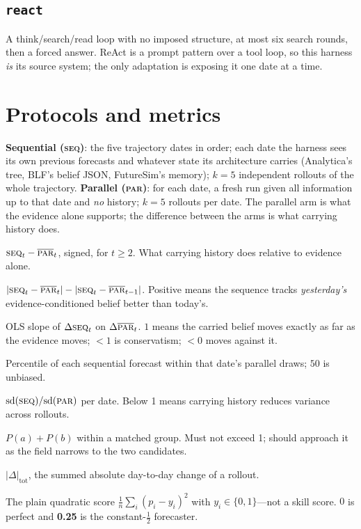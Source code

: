 \documentclass[10pt]{article}
\newcommand{\seq}{\textsc{seq}}
\newcommand{\pl}{\textsc{par}}
\newcommand{\hr}[1]{\texttt{#1}}
\begin{document}
\subsection{\hr{react}}
A think/search/read loop with no imposed structure, at most six search rounds, then a forced
answer. ReAct is a prompt pattern over a tool loop, so this harness \emph{is} its source system;
the only adaptation is exposing it one date at a time.

\FloatBarrier
\section{Protocols and metrics}\label{sec:protocol}
\textbf{Sequential (\seq)}: the five trajectory dates in order; each date the harness sees its own
previous forecasts and whatever state its architecture carries (Analytica's tree, BLF's belief JSON,
FutureSim's memory); $k{=}5$ independent rollouts of the whole trajectory.
\textbf{Parallel (\pl)}: for each date, a fresh run given all information up to that date and
\emph{no} history; $k{=}5$ rollouts per date. The parallel arm is what the evidence alone supports;
the difference between the arms is what carrying history does.

\begin{description}[leftmargin=1.6cm,style=nextline,itemsep=1pt]
\item[anchor gap] $\seq_t-\overline{\pl}_t$, signed, for $t\ge2$. What carrying history does
relative to evidence alone.
\item[lag advantage] $|\seq_t-\overline{\pl}_t|-|\seq_t-\overline{\pl}_{t-1}|$. Positive means the
sequence tracks \emph{yesterday's} evidence-conditioned belief better than today's.
\item[update gain] OLS slope of $\Delta\seq_t$ on $\Delta\overline{\pl}_t$. $1$ means the carried
belief moves exactly as far as the evidence moves; $<1$ is conservatism; $<0$ moves against it.
\item[placement (PIT)] Percentile of each sequential forecast within that date's parallel draws;
$50$ is unbiased.
\item[stabilisation] $\mathrm{sd}(\seq)/\mathrm{sd}(\pl)$ per date. Below 1 means carrying history
reduces variance across rollouts.
\item[coherence] $P(a)+P(b)$ within a matched group. Must not exceed 1; should approach it as the
field narrows to the two candidates.
\item[total movement] $|\Delta|_\text{tot}$, the summed absolute day-to-day change of a rollout.
\item[Brier] The plain quadratic score $\frac1n\sum_i(p_i-y_i)^2$ with $y_i\in\{0,1\}$---not a
skill score. $0$ is perfect and \textbf{0.25} is the constant-$\tfrac12$ forecaster.
\end{description}
\end{document}
